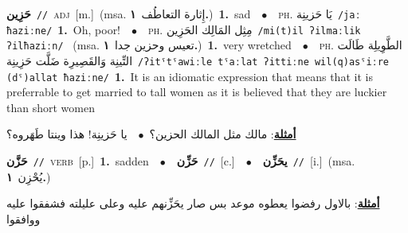 \documentclass[10pt,a4paper,twoside]{article} %
\begin{document}
\begin{multicols}{2}
{\setlength\topsep{0pt}\textbf{\foreignlanguage{arabic}{حَزِين}}\ {\color{gray}\texttt{//}\color{black}}\ \textsc{adj}\ [m.]\ \color{gray}(msa. \foreignlanguage{arabic}{إِثارة التعاطُف}~\foreignlanguage{arabic}{\textbf{١.}})\color{black}\ \textbf{1.}~sad\ \ $\bullet$\ \ \textsc{ph.} \color{gray} \foreignlanguage{arabic}{يَا حَزينِة}\color{black}\ {\color{gray}\texttt{/{\sffamily jaː ħaziːne}/}\color{black}}\ \textbf{1.}~Oh, poor!\ \ $\bullet$\ \ \textsc{ph.} \color{gray} \foreignlanguage{arabic}{مِثِل المَالِك الحَزِين}\color{black}\ {\color{gray}\texttt{/{\sffamily mi(t)il ʔilmaːlik ʔilħaziːn}/}\color{black}}\ \color{gray} (msa. \foreignlanguage{arabic}{تعيس وحزين جدا}~\foreignlanguage{arabic}{\textbf{١.}})\color{black}\ \textbf{1.}~very wretched\ \ $\bullet$\ \ \textsc{ph.} \color{gray} \foreignlanguage{arabic}{الطَّوِيلِة طَالَت التِّينِة وَالقَصِيرِة ضَلَّت حَزِينِة}\color{black}\ {\color{gray}\texttt{/{\sffamily ʔitˤtˤawiːle tˤaːlat ʔittiːne wil(q)asˤiːre (dˤ)allat ħaziːne}/}\color{black}}\ \textbf{1.}~It is an idiomatic expression that means that it is preferrable to get married to tall women as it is believed that they are luckier than short women\  \begin{flushright}\color{gray}\foreignlanguage{arabic}{\textbf{\underline{\foreignlanguage{arabic}{أمثلة}}}: مالك مثل المالك الحزين؟\ $\bullet$\ \  يا حَزينِة! هذا وينتا طَهَروه؟}\end{flushright}\color{black}} \vspace{2mm}

{\setlength\topsep{0pt}\textbf{\foreignlanguage{arabic}{حَزَّن}}\ {\color{gray}\texttt{//}\color{black}}\ \textsc{verb}\ [p.]\ \textbf{1.}~sadden\ \ $\bullet$\ \ \setlength\topsep{0pt}\textbf{\foreignlanguage{arabic}{حَزِّن}}\ {\color{gray}\texttt{//}\color{black}}\ [c.]\ \ $\bullet$\ \ \setlength\topsep{0pt}\textbf{\foreignlanguage{arabic}{يحَزِّن}}\ {\color{gray}\texttt{//}\color{black}}\ [i.]\ \color{gray}(msa. \foreignlanguage{arabic}{يُحْزِن}~\foreignlanguage{arabic}{\textbf{١.}})\color{black}\  \begin{flushright}\color{gray}\foreignlanguage{arabic}{\textbf{\underline{\foreignlanguage{arabic}{أمثلة}}}: بالاول رفضوا يعطوه موعد بس صار يحَزِّنهم عليه وعلى عليلته فشفقوا عليه ووافقوا}\end{flushright}\color{black}} \vspace{2mm}


\end{multicols}
\end{document}
